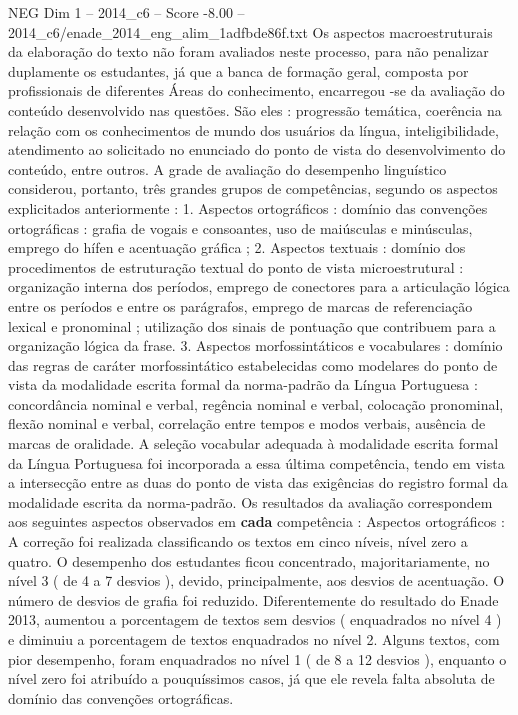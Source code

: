 \begin{textsample}{NEG Dim 1 – 2014\_c6 – Score -8.00 – 2014\_c6/enade\_2014\_eng\_alim\_1adfbde86f.txt}
Os aspectos macroestruturais da elaboração do texto não foram avaliados neste processo, para não penalizar duplamente os estudantes, já que a banca de formação geral, composta por profissionais de diferentes Áreas do conhecimento, encarregou -se da avaliação do conteúdo desenvolvido nas questões.
São eles : progressão temática, coerência na relação com os conhecimentos de mundo dos usuários da língua, inteligibilidade, atendimento ao solicitado no enunciado do ponto de vista do desenvolvimento do conteúdo, entre outros.
A grade de avaliação do desempenho linguístico considerou, portanto, três grandes grupos de competências, segundo os aspectos explicitados anteriormente : 1.
Aspectos ortográficos : domínio das convenções ortográficas : grafia de vogais e consoantes, uso de maiúsculas e minúsculas, emprego do hífen e acentuação gráfica ; 2.
Aspectos textuais : domínio dos procedimentos de estruturação textual do ponto de vista microestrutural : organização interna dos períodos, emprego de conectores para a articulação lógica entre os períodos e entre os parágrafos, emprego de marcas de referenciação lexical e pronominal ; utilização dos sinais de pontuação que contribuem para a organização lógica da frase. 3.
Aspectos morfossintáticos e vocabulares : domínio das regras de caráter morfossintático estabelecidas como modelares do ponto de vista da modalidade escrita formal da norma-padrão da Língua Portuguesa : concordância nominal e verbal, regência nominal e verbal, colocação pronominal, flexão nominal e verbal, correlação entre tempos e modos verbais, ausência de marcas de oralidade.
A seleção vocabular adequada à modalidade escrita formal da Língua Portuguesa foi incorporada a essa última competência, tendo em vista a intersecção entre as duas do ponto de vista das exigências do registro formal da modalidade escrita da norma-padrão.
Os resultados da avaliação correspondem aos seguintes aspectos observados em \textbf{cada} competência : Aspectos ortográficos : A correção foi realizada classificando os textos em cinco níveis, nível zero a quatro.
O desempenho dos estudantes ficou concentrado, majoritariamente, no nível 3 ( de 4 a 7 desvios ), devido, principalmente, aos desvios de acentuação.
O número de desvios de grafia foi reduzido.
Diferentemente do resultado do Enade 2013, aumentou a porcentagem de textos sem desvios ( enquadrados no nível 4 ) e diminuiu a porcentagem de textos enquadrados no nível 2.
Alguns textos, com pior desempenho, foram enquadrados no nível 1 ( de 8 a 12 desvios ), enquanto o nível zero foi atribuído a pouquíssimos casos, já que ele revela falta absoluta de domínio das convenções ortográficas.

\end{textsample}
